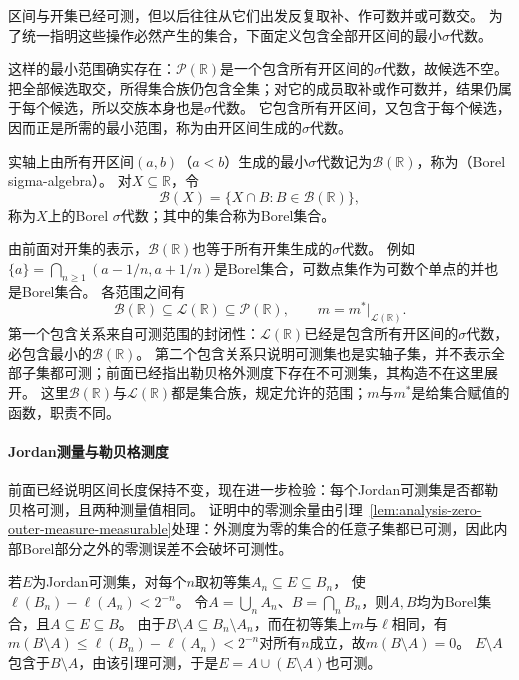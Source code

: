 区间与开集已经可测，但以后往往从它们出发反复取补、作可数并或可数交。
为了统一指明这些操作必然产生的集合，下面定义包含全部开区间的最小$\sigma$代数。

这样的最小范围确实存在：$\mathcal P(\mathbb R)$是一个包含所有开区间的$\sigma$代数，故候选不空。
把全部候选取交，所得集合族仍包含全集；对它的成员取补或作可数并，结果仍属于每个候选，所以交族本身也是$\sigma$代数。
它包含所有开区间，又包含于每个候选，因而正是所需的最小范围，称为由开区间生成的$\sigma$代数。
\begin{definition}
\label{def:analysis-borel-sigma-algebra}
实轴上由所有开区间$(a,b)$（$a<b$）生成的最小$\sigma$代数记为$\mathcal B(\mathbb R)$，称为（Borel sigma-algebra）。
对$X\subseteq\mathbb R$，令
\[
 \mathcal B(X)=\{X\cap B:B\in\mathcal B(\mathbb R)\},
\]
称为$X$上的Borel $\sigma$代数；其中的集合称为Borel集合。
\end{definition}

由前面对开集的表示，$\mathcal B(\mathbb R)$也等于所有开集生成的$\sigma$代数。
例如$\{a\}=\bigcap_{n\geq1}(a-1/n,a+1/n)$是Borel集合，可数点集作为可数个单点的并也是Borel集合。
各范围之间有
\[
 \mathcal B(\mathbb R)\subseteq\mathcal L(\mathbb R)\subseteq\mathcal P(\mathbb R),
 \qquad m=m^*\big|_{\mathcal L(\mathbb R)}.
\]
第一个包含关系来自可测范围的封闭性：$\mathcal L(\mathbb R)$已经是包含所有开区间的$\sigma$代数，必包含最小的$\mathcal B(\mathbb R)$。
第二个包含关系只说明可测集也是实轴子集，并不表示全部子集都可测；前面已经指出勒贝格外测度下存在不可测集，其构造不在这里展开。
这里$\mathcal B(\mathbb R)$与$\mathcal L(\mathbb R)$都是集合族，规定允许的范围；$m$与$m^*$是给集合赋值的函数，职责不同。

\paragraph{Jordan测量与勒贝格测度}

前面已经说明区间长度保持不变，现在进一步检验：每个Jordan可测集是否都勒贝格可测，且两种测量值相同。
证明中的零测余量由引理~\ref{lem:analysis-zero-outer-measure-measurable}处理：外测度为零的集合的任意子集都已可测，因此内部Borel部分之外的零测误差不会破坏可测性。

若$E$为Jordan可测集，对每个$n$取初等集$A_n\subseteq E\subseteq B_n$，
使$\ell(B_n)-\ell(A_n)<2^{-n}$。
令$A=\bigcup_nA_n$、$B=\bigcap_nB_n$，则$A,B$均为Borel集合，且$A\subseteq E\subseteq B$。
由于$B\setminus A\subseteq B_n\setminus A_n$，而在初等集上$m$与$\ell$相同，有
$m(B\setminus A)\leq\ell(B_n)-\ell(A_n)<2^{-n}$对所有$n$成立，故$m(B\setminus A)=0$。
$E\setminus A$包含于$B\setminus A$，由该引理可测，于是$E=A\cup(E\setminus A)$也可测。

